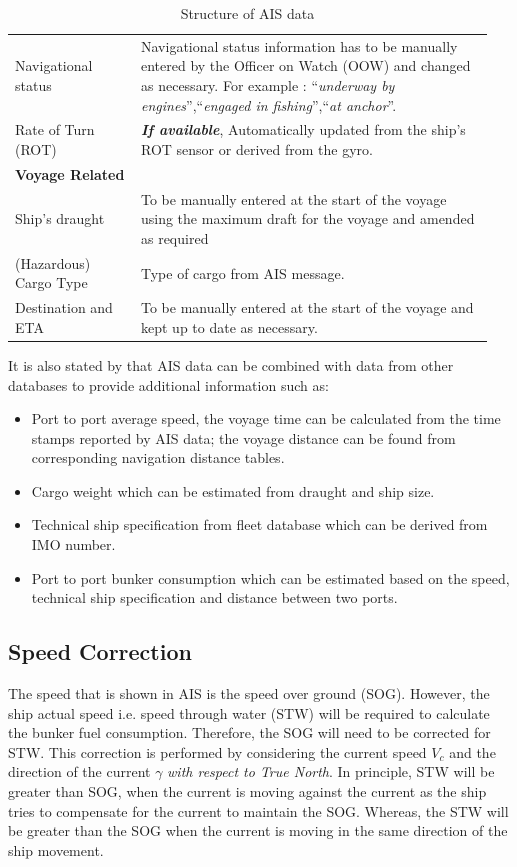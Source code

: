 \begin{table}
{\begin{tabular}{ p{0.25\linewidth} p{0.7\linewidth}  }
    Navigational status & Navigational status information has to be manually entered by the Officer on Watch (OOW) and changed as necessary. For example : ``\emph{underway by engines}'',``\emph{engaged in fishing}'',``\emph{at anchor}''.\\
    Rate of Turn (ROT) & \emph{\textbf{If available}}, Automatically updated from the ship's ROT sensor or derived from
    the gyro.\\
    \hline
    \multicolumn{2}{l}{\textbf{Voyage Related}}\\
    \hline
    Ship's draught & To be manually entered at the start of the voyage using the
    maximum draft for the voyage and amended as required \\
    (Hazardous) Cargo Type & Type of cargo from AIS message.\\
    Destination and ETA & To be manually entered at the start of the voyage and kept up to
    date as necessary.\\
    \end{tabular}}
\caption{Structure of AIS data }\label{tbl:AIS_struct}
\end{table}

It is also stated by  that AIS data can be combined with data from other databases to provide additional information such as:\\

\begin{itemize}
    \setlength\itemsep{0em}
    \item Port to port average speed, the voyage time can be calculated from the time stamps reported by AIS data; the voyage distance can be found from corresponding navigation distance tables.
    \item Cargo weight which can be estimated from draught and ship size.
    \item Technical ship specification from fleet database which can be derived from IMO number.
    \item Port to port bunker consumption which can be estimated based on the speed, technical ship specification and distance between two ports.
\end{itemize}

\subsection{Speed Correction}\label{sec:SOG_corr}

The speed that is shown in AIS is the speed over ground (SOG). However, the ship actual speed i.e. speed through water (STW) will be required to calculate the bunker fuel consumption. Therefore, the SOG will need to be corrected for STW. This correction is performed by considering the current speed $V_c$ and the direction of the current $\gamma$ \emph{with respect to True North}. In principle, STW will be greater than SOG, when the current is moving against the current as the ship tries to compensate for the current to maintain the SOG. Whereas, the STW will be greater than the SOG when the current is moving in the same direction of the ship movement. \\


